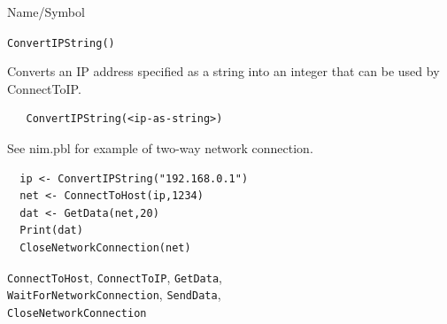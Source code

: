 \begin{desc}{Name/Symbol}
\item[Name/Symbol] \verb+ConvertIPString()+

\item[Description]	Converts an IP address specified as a string into
  an integer that can be used by ConnectToIP.

\item[Usage]
\begin{verbatim}
   ConvertIPString(<ip-as-string>)
\end{verbatim}

\item[Example]	

  See nim.pbl for example of two-way network connection.
\begin{verbatim}
  ip <- ConvertIPString("192.168.0.1")
  net <- ConnectToHost(ip,1234)
  dat <- GetData(net,20)
  Print(dat)
  CloseNetworkConnection(net)
\end{verbatim}

\item[See Also]
  \verb+ConnectToHost+, \verb+ConnectToIP+, \verb+GetData+, \\ \verb+WaitForNetworkConnection+,
   \verb+SendData+, \\\verb+CloseNetworkConnection+
\end{desc}





